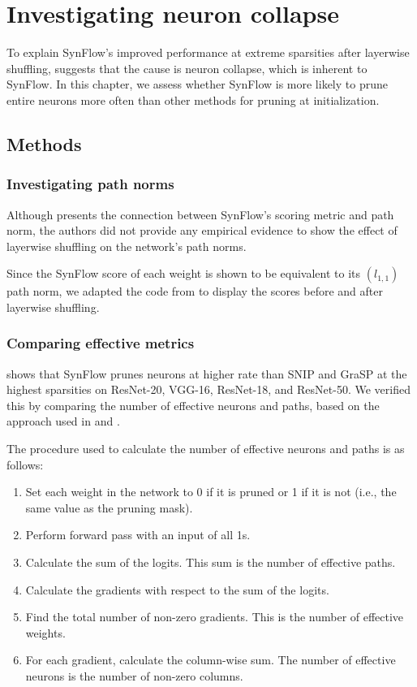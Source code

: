 
\chapter{Investigating neuron collapse}
\label{ch:collapse}
\vspace{1em}

To explain SynFlow's improved performance at extreme sparsities after layerwise shuffling, \textcite{frankle21} suggests that the cause is neuron collapse, which is inherent to SynFlow. In this chapter, we assess whether SynFlow is more likely to prune entire neurons more often than other methods for pruning at initialization.


\section{Methods}
\subsection{Investigating path norms}
Although \textcite{frankle21} presents the connection between SynFlow's scoring metric and path norm, the authors did not provide any empirical evidence to show the effect of layerwise shuffling on the network's path norms.

Since the SynFlow score of each weight is shown to be equivalent to its $(l_{1,1})$ path norm, we adapted the code from \textcite{synflow20} to display the scores before and after layerwise shuffling.

\subsection{Comparing effective metrics}
\label{sec:effective}
\textcite{frankle21} shows that SynFlow prunes neurons at higher rate than SNIP and GraSP at the highest sparsities on ResNet-20, VGG-16, ResNet-18, and ResNet-50. We verified this by comparing the number of effective neurons and paths, based on the approach used in \textcite{frankle21} and \textcite{pham23}.

The procedure used to calculate the number of effective neurons and paths is as follows:
\begin{enumerate}
    \item Set each weight in the network to 0 if it is pruned or 1 if it is not (i.e., the same value as the pruning mask).
    \item Perform forward pass with an input of all 1s.
    \item Calculate the sum of the logits. This sum is the number of effective paths.
    \item Calculate the gradients with respect to the sum of the logits.
    \item Find the total number of non-zero gradients. This is the number of effective weights.
    \item For each gradient, calculate the column-wise sum. The number of effective neurons is the number of non-zero columns.
\end{enumerate}

